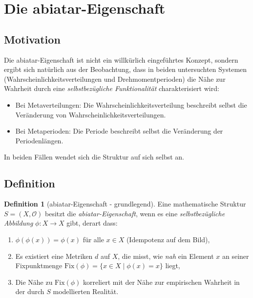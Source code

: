 \documentclass[a4paper,12pt]{article}
\theoremstyle{definition}
\newtheorem{definition}{Definition}
\begin{document}
\section{Die abiatar-Eigenschaft}

\subsection{Motivation}

Die abiatar-Eigenschaft ist nicht ein willkürlich eingeführtes Konzept, sondern ergibt sich natürlich aus der Beobachtung, dass in beiden untersuchten Systemen (Wahrscheinlichkeitsverteilungen und Drehmomentperioden) die Nähe zur Wahrheit durch eine \textit{selbstbezügliche Funktionalität} charakterisiert wird:

\begin{itemize}
	\item Bei Metaverteilungen: Die Wahrscheinlichkeitsverteilung beschreibt selbst die Veränderung von Wahrscheinlichkeitsverteilungen.
	\item Bei Metaperioden: Die Periode beschreibt selbst die Veränderung der Periodenlängen.
\end{itemize}

In beiden Fällen wendet sich die Struktur auf sich selbst an.

\subsection{Definition}

\begin{definition}[abiatar-Eigenschaft - grundlegend]
Eine mathematische Struktur $S = (X, \mathcal{O})$ besitzt die \textit{abiatar-Eigenschaft}, wenn es eine \textit{selbstbezügliche Abbildung} $\phi: X \to X$ gibt, derart dass:
\begin{enumerate}
	\item $\phi(\phi(x)) = \phi(x)$ für alle $x \in X$ (Idempotenz auf dem Bild),
	\item Es existiert eine Metriken $d$ auf $X$, die misst, wie \textit{nah} ein Element $x$ an seiner Fixpunktmenge $\text{Fix}(\phi) = \{x \in X \mid \phi(x) = x\}$ liegt,
	\item Die Nähe zu $\text{Fix}(\phi)$ korreliert mit der Nähe zur empirischen Wahrheit in der durch $S$ modellierten Realität.
\end{enumerate}
\end{definition}
\end{document}
